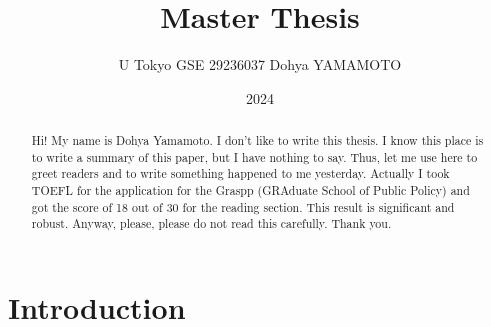 \documentclass{article}
\title{Master Thesis}
\author{U Tokyo GSE 29236037 Dohya YAMAMOTO}
\date{2024}
\begin{document}
\maketitle

\begin{abstract}
    Hi! My name is Dohya Yamamoto. I don't like to write this thesis. I know this place is to write a summary of this paper, but I have nothing to say. Thus, let me use here to greet readers and to write something happened to me yesterday. Actually I took TOEFL for the application for the Graspp (GRAduate School of Public Policy) and got the score of 18 out of 30 for the reading section. This result is significant and robust. Anyway,  please, please do not read this carefully. Thank you.
\end{abstract}


\section{Introduction}
\end{document}
